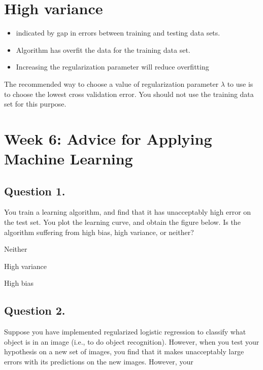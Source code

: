 \documentclass[11pt]{article} %
\begin{document}




\section*{High variance}

\begin{itemize}
	\item indicated by gap in errors between training and testing data sets.
	\item Algorithm has overfit the data for the training data set.
	\item Increasing the regularization parameter will reduce overfitting
\end{itemize}
The recommended way to choose a value of regularization parameter $\lambda$ to use is to choose
the lowest cross validation error.
You should not use the training data set for this purpose.

\section{Week 6: Advice for Applying Machine Learning}

\subsection*{Question 1. }
You train a learning algorithm, and find that it has unacceptably high error on the test set. You plot the learning curve, and obtain the figure below. Is the algorithm suffering from high bias, high variance, or neither?



Neither

High variance

High bias
\subsection*{Question 2. }
Suppose you have implemented regularized logistic regression  to classify what object is in an image (i.e., to do object recognition). However, when you test your hypothesis on a new set of images, you find that it makes unacceptably large 
errors with its predictions on the new images. However, your
\end{document}

